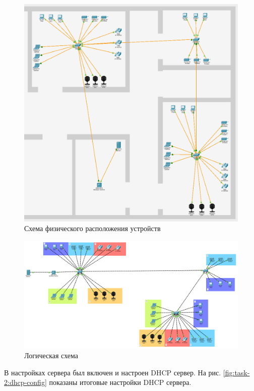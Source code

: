 \documentclass[a4paper, 14pt]{extarticle}
\begin{document}
\begin{figure}[H]
  \centering
  \includegraphics[width=\textwidth]{images/task-2/physical-2.png}
  \caption{Схема физического расположения устройств}
  \label{fig:task-2:physical-2}
\end{figure}

\begin{figure}[H]
  \centering
  \includegraphics[width=\textwidth]{images/task-2/logical-2.png}
  \caption{Логическая схема}
  \label{fig:task-2:logical-2}
\end{figure}

В настройках сервера был включен и настроен DHCP сервер. На рис.
\ref{fig:task-2:dhcp-config} показаны итоговые настройки DHCP сервера.
\end{document}
